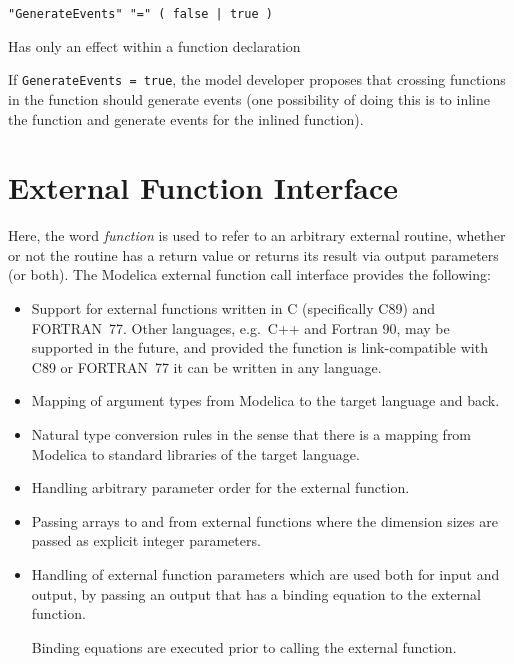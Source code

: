 \begin{annotationdefinition}[GenerateEvents]
\begin{synopsis}[grammar]\begin{lstlisting}
"GenerateEvents" "=" ( false | true )
\end{lstlisting}\end{synopsis}
\begin{semantics}
Has only an effect within a function declaration

If \lstinline!GenerateEvents = true!, the model developer proposes that crossing functions in the function should generate events (one possibility of doing this is to inline the function and generate events for the inlined function).

\end{semantics}
\end{annotationdefinition}


\section{External Function Interface}\label{external-function-interface}

Here, the word \emph{function} is used to refer to an arbitrary external routine, whether or not the routine has a return value or returns its result via output parameters (or both).
The Modelica external function call interface provides the following:
\begin{itemize}
\item
  Support for external functions written in C (specifically C89) and
  FORTRAN~77. Other languages, e.g.\ C++ and Fortran 90, may be supported
  in the future, and provided the function is link-compatible with C89
  or FORTRAN~77 it can be written in any language.
\item
  Mapping of argument types from Modelica to the target language and
  back.
\item
  Natural type conversion rules in the sense that there is a mapping
  from Modelica to standard libraries of the target language.
\item
  Handling arbitrary parameter order for the external function.
\item
  Passing arrays to and from external functions where the dimension
  sizes are passed as explicit integer parameters.
\item
  Handling of external function parameters which are used both for input
  and output, by passing an output that has a binding equation to
  the external function.
  \begin{nonnormative}
  Binding equations are executed prior to calling the external function.
  \end{nonnormative}
\end{itemize}

